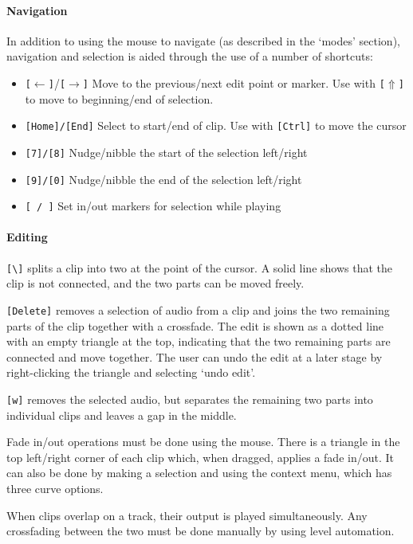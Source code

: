 \paragraph{Navigation}
In addition to using the mouse to navigate (as described in the `modes'
section), navigation and selection is aided through the use of a number of
shortcuts:
\begin{itemize}
  \item \texttt{[$\leftarrow$]}/\texttt{[$\rightarrow$]} Move to the
    previous/next edit point or marker. Use with \texttt{[$\Uparrow$]} to move
    to beginning/end of selection.
  \item \texttt{[Home]/[End]} Select to start/end of clip. Use with
    \texttt{[Ctrl]} to move the cursor
  \item \texttt{[7]/[8]} Nudge/nibble the start of the selection left/right
  \item \texttt{[9]/[0]} Nudge/nibble the end of the selection left/right
  \item \texttt{[ / ]} Set in/out markers for selection while playing
\end{itemize}

\paragraph{Editing}

\verb$[\]$ splits a clip into two at the point of the cursor. A solid line
shows that the clip is not connected, and the two parts can be moved freely.

\texttt{[Delete]} removes a selection of audio from a clip and joins the two
remaining parts of the clip together with a crossfade. The edit is shown as a
dotted line with an empty triangle at the top, indicating that the two
remaining parts are connected and move together. The user can undo the edit at
a later stage by right-clicking the triangle and selecting `undo edit'.

\texttt{[w]} removes the selected audio, but separates the remaining two parts
into individual clips and leaves a gap in the middle.

Fade in/out operations must be done using the mouse. There is a triangle in the
top left/right corner of each clip which, when dragged, applies a fade in/out.
It can also be done by making a selection and using the context menu, which has
three curve options.

When clips overlap on a track, their output is played simultaneously. Any
crossfading between the two must be done manually by using level automation.

